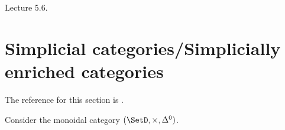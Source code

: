 Lecture 5.6.

\section{Simplicial categories/Simplicially enriched categories}

The reference for this section is \cite[2.4]{kerodon}.

Consider the monoidal category $ ( \SetD , \times , \Delta^0 ) $.
\begin{comment}
\begin{defi}
	A \textbf{simplicial category} $ \mathcal{ C }_\bullet $ is a category enriched in simplicial sets.
	Explicitely $ \mathcal{ C }_\bullet $ consists of 
	\begin{itemize}
		\item 
		a class $ \Ob ( \mathcal{ C }_\bullet ) $ of objects of $ \mathcal{ C }_\bullet $,
		
		\item 
		for all $ X , Y \in \Ob ( \mathcal{ C }_\bullet ), \underline{ \Hom}_{ \mathcal{ C }_\bullet } ( X , Y ) \in \SetD $ is a simplicial set of morphisms,
			
		\item
		$ \forall X \in \Ob ( \mathcal{ C } ) $ an identity morphism $ \id_X \colon \Delta^0 \to \underline{ \Hom }_{ \mathcal{ C }_\bullet } ( X , X ) $ that is $ \id_X \in \underline{ \Hom }_{ \mathcal{ C }_\bullet } ( X , X )_0 $,
		

\end{comment}
